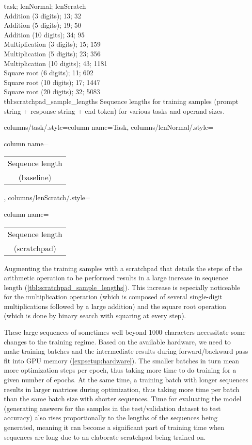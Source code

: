 {
    task; lenNormal; lenScratch\\
    Addition (3 digits); 13; 32 \\
    Addition (5 digits); 19; 50 \\
    Addition (10 digits); 34; 95 \\
    Multiplication (3 digits); 15; 159 \\
    Multiplication (5 digits); 23; 356 \\
    Multiplication (10 digits); 43; 1181 \\
    Square root (6 digits); 11; 602 \\
    Square root (10 digits); 17; 1447 \\
    Square root (20 digits); 32; 5083 \\
}
{tbl:scratchpad_sample_lengths}
{
    Sequence lengths for training samples (prompt string + response string + end token) for various tasks and operand sizes.
}
{%
    columns/task/.style={column name={Task}},
    columns/lenNormal/.style={column name={\begin{tabular}{c} Sequence length \\ (baseline) \\ \end{tabular}}},
    columns/lenScratch/.style={column name={\begin{tabular}{c} Sequence length \\ (scratchpad) \\ \end{tabular}}}
}

Augmenting the training samples with a scratchpad that details the steps of the arithmetic operation to be performed results in a large increase in sequence length (\cref{tbl:scratchpad_sample_lengths}). This increase is especially noticeable for the multiplication operation (which is composed of several single-digit multiplications followed by a large addition) and the square root operation (which is done by binary search with squaring at every step).

These large sequences of sometimes well beyond 1000 characters necessitate some changes to the training regime. Based on the available hardware, we need to make training batches and the intermediate results during forward/backward pass fit into GPU memory (\cref{expsetup:hardware}). The smaller batches in turn mean more optimization steps per epoch, thus taking more time to do training for a given number of epochs. At the same time, a training batch with longer sequences results in larger matrices during optimization, thus taking more time per batch than the same batch size with shorter sequences.
Time for evaluating the model (generating answers for the samples in the test/validation dataset to test accuracy) also rises proportionally to the lengths of the sequences being generated, meaning it can become a significant part of training time when sequences are long due to an elaborate scratchpad being trained on.

